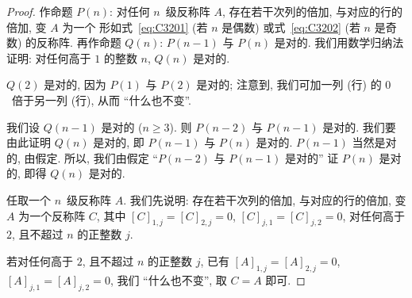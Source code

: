 \begin{proof}
    作命题 \(P(n)\):
    对任何 \(n\)~级反称阵 \(A\),
    存在若干次列的倍加, 与对应的行的倍加,
    变 \(A\) 为一个%
    形如式~\eqref{eq:C3201} (若 \(n\) 是偶数)
    或式~\eqref{eq:C3202} (若 \(n\) 是奇数)
    的反称阵.
    再作命题 \(Q(n)\):
    \(P(n-1)\) 与 \(P(n)\) 是对的.
    我们用数学归纳法证明:
    对任何高于 \(1\) 的整数 \(n\), \(Q(n)\) 是对的.

    \(Q(2)\) 是对的,
    因为 \(P(1)\) 与 \(P(2)\) 是对的;
    注意到,
    我们可加一列 (行) 的 \(0\)~倍于另一列 (行),
    从而 ``什么也不变''.

    我们设 \(Q(n-1)\) 是对的 (\(n \geq 3\)).
    则 \(P(n-2)\) 与 \(P(n-1)\) 是对的.
    我们要由此证明 \(Q(n)\) 是对的,
    即 \(P(n-1)\) 与 \(P(n)\) 是对的.
    \(P(n-1)\) 当然是对的, 由假定.
    所以, 我们由假定
    ``\(P(n-2)\) 与 \(P(n-1)\) 是对的''
    证 \(P(n)\) 是对的,
    即得 \(Q(n)\) 是对的.

    任取一个 \(n\)~级反称阵 \(A\).
    我们先说明:
    存在若干次列的倍加, 与对应的行的倍加,
    变 \(A\) 为一个反称阵 \(C\),
    其中
    \([C]_{1,j} = [C]_{2,j} = 0\),
    \([C]_{j,1} = [C]_{j,2} = 0\),
    对任何高于 \(2\), 且不超过 \(n\) 的正整数 \(j\).

    若对任何高于 \(2\), 且不超过 \(n\) 的正整数 \(j\),
    已有
    \([A]_{1,j} = [A]_{2,j} = 0\),
    \([A]_{j,1} = [A]_{j,2} = 0\),
    我们 ``什么也不变'', 取 \(C = A\) 即可.


\end{proof}
